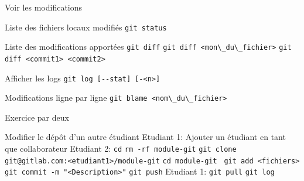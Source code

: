\documentclass{beamer}
\begin{document}
\begin{frame}[fragile]{Voir les modifications}
  \begin{block}{Liste des fichiers locaux modifiés}
    \textcolor{commandcolor}{\verb?git status?}
  \end{block}
  \begin{block}{Liste des modifications apportées}
    \textcolor{commandcolor}{\verb?git diff?}\linebreak
    \textcolor{commandcolor}{\verb?git diff <mon\_du\_fichier>?}\linebreak
    \textcolor{commandcolor}{\verb?git diff <commit1> <commit2>?}
  \end{block}
  \begin{block}{Afficher les logs}
    \textcolor{commandcolor}{\verb?git log [--stat] [-<n>]?}
  \end{block}
  \begin{block}{Modifications ligne par ligne}
    \textcolor{commandcolor}{\verb?git blame <nom\_du\_fichier>?}
  \end{block}
\end{frame}

\begin{frame}[fragile]{Exercice par deux}
  \begin{exampleblock}{Modifier le dépôt d'un autre étudiant}
    Etudiant 1: Ajouter un étudiant en tant que collaborateur\linebreak\linebreak
    Etudiant 2:\linebreak
    \textcolor{commandcolor}{\verb?cd?}\linebreak
    \textcolor{commandcolor}{\verb?rm -rf module-git?}\linebreak
    \textcolor{commandcolor}{\verb?git clone git@gitlab.com:<etudiant1>/module-git?}\linebreak
    \textcolor{commandcolor}{\verb?cd module-git ?}\linebreak
    \textcolor{commandcolor}{\verb?git add <fichiers>?}\linebreak
    \textcolor{commandcolor}{\verb?git commit -m "<Description>"?}\linebreak
    \textcolor{commandcolor}{\verb?git push?}\linebreak
    \linebreak
    Etudiant 1:\linebreak
    \textcolor{commandcolor}{\verb?git pull?}\linebreak
    \textcolor{commandcolor}{\verb?git log?}
  \end{exampleblock}
\end{frame}
\end{document}
